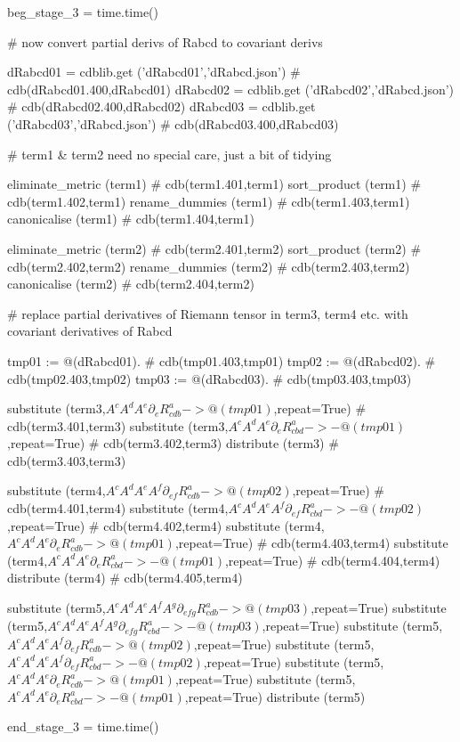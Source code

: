 \documentclass[12pt]{cdblatex}
\begin{document}
\begin{cadabra}
   beg_stage_3 = time.time()

   # now convert partial derivs of Rabcd to covariant derivs

   dRabcd01 = cdblib.get ('dRabcd01','dRabcd.json')  # cdb(dRabcd01.400,dRabcd01)
   dRabcd02 = cdblib.get ('dRabcd02','dRabcd.json')  # cdb(dRabcd02.400,dRabcd02)
   dRabcd03 = cdblib.get ('dRabcd03','dRabcd.json')  # cdb(dRabcd03.400,dRabcd03)

   # term1 & term2 need no special care, just a bit of tidying

   eliminate_metric (term1)   # cdb(term1.401,term1)
   sort_product     (term1)   # cdb(term1.402,term1)
   rename_dummies   (term1)   # cdb(term1.403,term1)
   canonicalise     (term1)   # cdb(term1.404,term1)

   eliminate_metric (term2)   # cdb(term2.401,term2)
   sort_product     (term2)   # cdb(term2.402,term2)
   rename_dummies   (term2)   # cdb(term2.403,term2)
   canonicalise     (term2)   # cdb(term2.404,term2)

   # replace partial derivatives of Riemann tensor in term3, term4 etc. with covariant derivatives of Rabcd

   tmp01 := @(dRabcd01).      # cdb(tmp01.403,tmp01)
   tmp02 := @(dRabcd02).      # cdb(tmp02.403,tmp02)
   tmp03 := @(dRabcd03).      # cdb(tmp03.403,tmp03)

   substitute (term3,$A^{c}A^{d}A^{e}\partial_{e}{R^{a}_{c d b}} ->   @(tmp01)$,repeat=True)         # cdb(term3.401,term3)
   substitute (term3,$A^{c}A^{d}A^{e}\partial_{e}{R^{a}_{c b d}} -> - @(tmp01)$,repeat=True)         # cdb(term3.402,term3)
   distribute (term3)                                                                                # cdb(term3.403,term3)

   substitute (term4,$A^{c}A^{d}A^{e}A^{f}\partial_{e f}{R^{a}_{c d b}} ->   @(tmp02)$,repeat=True)  # cdb(term4.401,term4)
   substitute (term4,$A^{c}A^{d}A^{e}A^{f}\partial_{e f}{R^{a}_{c b d}} -> - @(tmp02)$,repeat=True)  # cdb(term4.402,term4)
   substitute (term4,$A^{c}A^{d}A^{e}\partial_{e}{R^{a}_{c d b}} ->   @(tmp01)$,repeat=True)         # cdb(term4.403,term4)
   substitute (term4,$A^{c}A^{d}A^{e}\partial_{e}{R^{a}_{c b d}} -> - @(tmp01)$,repeat=True)         # cdb(term4.404,term4)
   distribute (term4)                                                                                # cdb(term4.405,term4)

   substitute (term5,$A^{c}A^{d}A^{e}A^{f}A^{g}\partial_{e f g}{R^{a}_{c d b}} ->   @(tmp03)$,repeat=True)
   substitute (term5,$A^{c}A^{d}A^{e}A^{f}A^{g}\partial_{e f g}{R^{a}_{c b d}} -> - @(tmp03)$,repeat=True)
   substitute (term5,$A^{c}A^{d}A^{e}A^{f}\partial_{e f}{R^{a}_{c d b}} ->   @(tmp02)$,repeat=True)
   substitute (term5,$A^{c}A^{d}A^{e}A^{f}\partial_{e f}{R^{a}_{c b d}} -> - @(tmp02)$,repeat=True)
   substitute (term5,$A^{c}A^{d}A^{e}\partial_{e}{R^{a}_{c d b}} ->   @(tmp01)$,repeat=True)
   substitute (term5,$A^{c}A^{d}A^{e}\partial_{e}{R^{a}_{c b d}} -> - @(tmp01)$,repeat=True)
   distribute (term5)

   end_stage_3 = time.time()
\end{cadabra}
\end{document}
